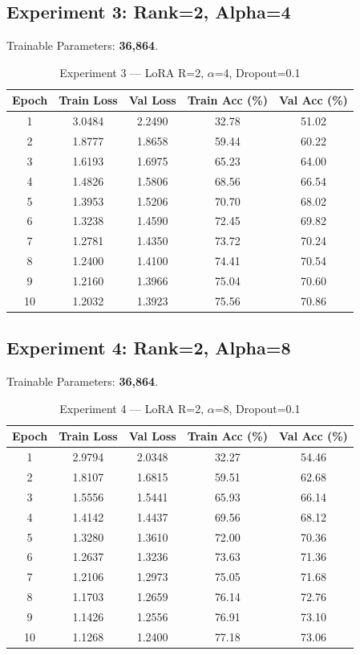 \documentclass[12pt,a4paper]{article}
\begin{document}
\subsection{Experiment 3: Rank=2, Alpha=4}
Trainable Parameters: \textbf{36,864}.

\begin{table}[H]
\centering
\caption{Experiment 3 --- LoRA R=2, $\alpha$=4, Dropout=0.1}
\small
\begin{tabular}{ccccc}
\toprule
Epoch & Train Loss & Val Loss & Train Acc (\%) & Val Acc (\%) \\
\midrule
1  & 3.0484 & 2.2490 & 32.78 & 51.02 \\
2  & 1.8777 & 1.8658 & 59.44 & 60.22 \\
3  & 1.6193 & 1.6975 & 65.23 & 64.00 \\
4  & 1.4826 & 1.5806 & 68.56 & 66.54 \\
5  & 1.3953 & 1.5206 & 70.70 & 68.02 \\
6  & 1.3238 & 1.4590 & 72.45 & 69.82 \\
7  & 1.2781 & 1.4350 & 73.72 & 70.24 \\
8  & 1.2400 & 1.4100 & 74.41 & 70.54 \\
9  & 1.2160 & 1.3966 & 75.04 & 70.60 \\
10 & 1.2032 & 1.3923 & 75.56 & 70.86 \\
\bottomrule
\end{tabular}
\end{table}

\subsection{Experiment 4: Rank=2, Alpha=8}
Trainable Parameters: \textbf{36,864}.

\begin{table}[H]
\centering
\caption{Experiment 4 --- LoRA R=2, $\alpha$=8, Dropout=0.1}
\small
\begin{tabular}{ccccc}
\toprule
Epoch & Train Loss & Val Loss & Train Acc (\%) & Val Acc (\%) \\
\midrule
1  & 2.9794 & 2.0348 & 32.27 & 54.46 \\
2  & 1.8107 & 1.6815 & 59.51 & 62.68 \\
3  & 1.5556 & 1.5441 & 65.93 & 66.14 \\
4  & 1.4142 & 1.4437 & 69.56 & 68.12 \\
5  & 1.3280 & 1.3610 & 72.00 & 70.36 \\
6  & 1.2637 & 1.3236 & 73.63 & 71.36 \\
7  & 1.2106 & 1.2973 & 75.05 & 71.68 \\
8  & 1.1703 & 1.2659 & 76.14 & 72.76 \\
9  & 1.1426 & 1.2556 & 76.91 & 73.10 \\
10 & 1.1268 & 1.2400 & 77.18 & 73.06 \\
\bottomrule
\end{tabular}
\end{table}
\end{document}
